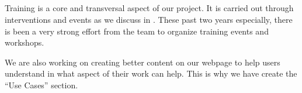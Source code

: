 

\subparagraph{}

Training is a core and transversal aspect of our project. It is carried out
through interventions and events as we discuss in . These
past two years especially, there is been a very strong effort from the \ODK team to organize
training events and workshops. 

We are also working on creating better content on our webpage
to help users understand in what aspect of their work can \ODK help. This is why we have create the
``Use Cases'' section.
\subparagraph{}
\label{dissem@devel-workshops}

